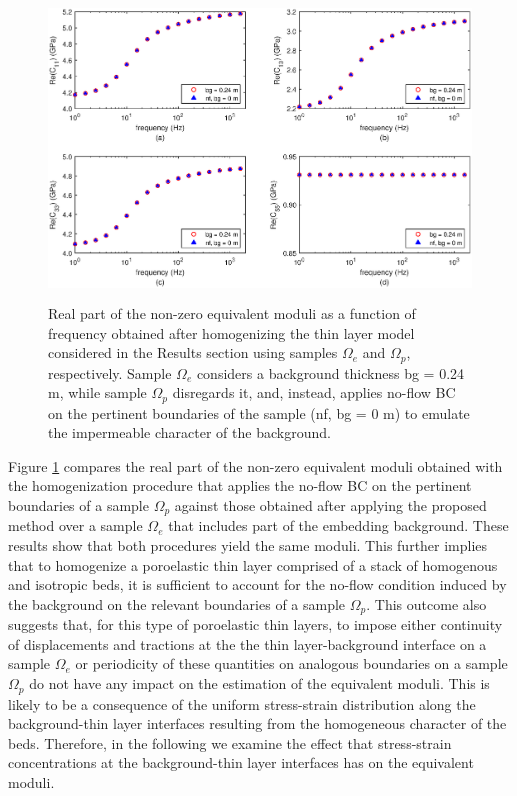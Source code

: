 \documentclass[draft]{agujournal2019}
\begin{document}
\begin{figure}[!ht]
\centering
        \includegraphics[width= 120mm, height=80mm]{Figure5.eps}
\caption{Real part of the non-zero equivalent moduli as a function of frequency obtained after homogenizing the thin layer model considered in the Results section using samples $\Omega_e$ and  $\Omega_p$, respectively. Sample $\Omega_e$ considers a background thickness bg = 0.24 m, while sample $\Omega_p$ disregards it, and, instead, applies no-flow BC on the pertinent boundaries of the sample (nf, bg = 0 m) to emulate the impermeable character of the background.}
\label{fig.5}
\end{figure}

Figure \ref{fig.5} compares the real part of the non-zero equivalent moduli obtained with the homogenization procedure that applies the no-flow BC on the pertinent boundaries of a sample $\Omega_p$ against those obtained after applying the proposed method over a sample $\Omega_e$ that includes part of the embedding background. These results show that both procedures yield the same moduli. This further implies that to homogenize a poroelastic thin layer comprised of a stack of homogenous and isotropic beds, it is sufficient to account for the no-flow condition induced by the background on the relevant boundaries of a sample $\Omega_p$. This outcome also suggests that, for this type of poroelastic thin layers, to impose either continuity of displacements and tractions at the the thin layer-background interface on a sample $\Omega_e$ or periodicity of these quantities on analogous boundaries on a sample $\Omega_p$ do not have any impact on the estimation of the equivalent moduli.
This is likely to be a consequence of the uniform stress-strain distribution along the background-thin layer interfaces resulting from the homogeneous character of the beds. Therefore, in the following  we examine the effect that stress-strain concentrations at the background-thin layer interfaces has on the equivalent moduli.
\end{document}
